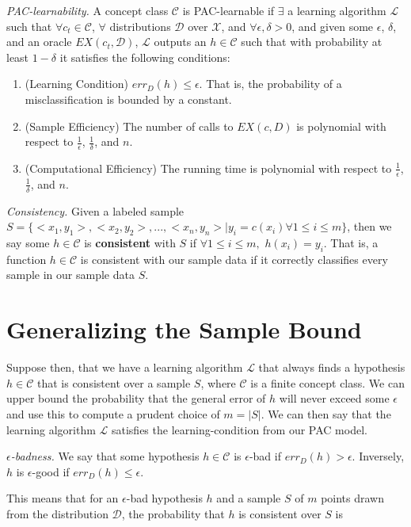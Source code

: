 \documentclass{article}
\newcommand{\ee}{\ensuremath{\epsilon}}
\begin{document}
\emph{PAC-learnability.} A concept class $\mathcal{C}$ is PAC-learnable
if $\exists$ a learning algorithm
$\mathcal{L}$ such that $\forall c_t \in \mathcal{C}$, $\forall$
distributions $\mathcal{D}$ over $\mathcal{X}$, and
$\forall \ee, \delta > 0$, and given some $\ee$, $\delta$, and
an oracle $EX(c_t, \mathcal{D})$, $\mathcal{L}$ outputs an
$h \in \mathcal{C}$ such that with probability at least $1-\delta$ it
satisfies the following conditions:
\begin{enumerate}
    \item (Learning Condition) $err_D(h) \leq
        \ee$. That is, the probability of a misclassification is
        bounded by a constant.
    \item (Sample Efficiency) The number of calls to $EX(c, D)$ is
        polynomial with respect to $\frac{1}{\ee}$,
        $\frac{1}{\delta}$, and $n$.
    \item (Computational Efficiency) The running time is
        polynomial with respect to $\frac{1}{\ee}$,
        $\frac{1}{\delta}$, and $n$.
\end{enumerate}

\emph{Consistency.} Given a labeled
sample $S = \{<x_1, y_1>, <x_2, y_2>, ..., <x_n, y_n> | y_i = c(x_i)
\forall 1 \leq i \leq m\}$, then we say some $h \in \mathcal{C}$ is
\textbf{consistent} with $S$ if $\forall 1 \leq i \leq m,$
$h(x_i) = y_i$. That is, a function $h \in \mathcal{C}$ is consistent
with our sample data if it correctly classifies every sample in our
sample data $S$.

\section{Generalizing the Sample Bound}
Suppose then, that we have a learning algorithm $\mathcal{L}$ that always
finds a hypothesis $h \in \mathcal{C}$ that is consistent over a sample $S$,
where $\mathcal{C}$ is a finite concept class. We can upper bound the
probability that the general error of $h$ will never exceed some $\epsilon$
and use this to compute a prudent choice of $m = |S|$. We can then say that
the learning algorithm $\mathcal{L}$ satisfies the learning-condition from
our PAC model.

\emph{$\epsilon$-badness.} We say that some hypothesis $h \in \mathcal{C}$
is $\epsilon$-bad if $err_D(h) > \epsilon$. Inversely, $h$ is
$\epsilon$-good if $err_D(h) \leq \epsilon$.

This means that for an $\epsilon$-bad hypothesis $h$ and a sample $S$ of
$m$ points drawn from the distribution $\mathcal{D}$, the probability
that $h$ is consistent over $S$ is
\end{document}
